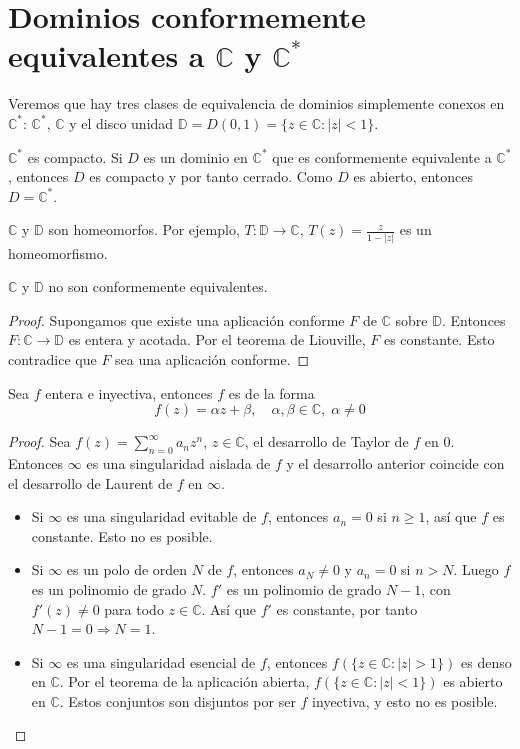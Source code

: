 \section{Dominios conformemente equivalentes a $\mathbb{C}$ y $\mathbb{C}^\ast$}
Veremos que hay tres clases de equivalencia de dominios simplemente conexos en $\mathbb{C}^\ast$: $\mathbb{C}^\ast$, $\mathbb{C}$ y el disco unidad $\mathbb{D} = D(0, 1) = \{z \in \mathbb{C} : |z| < 1\}$.

$\mathbb{C}^\ast$ es compacto.
Si $D$ es un dominio en $\mathbb{C}^\ast$ que es conformemente equivalente a $\mathbb{C}^\ast$, entonces $D$ es compacto y por tanto cerrado.
Como $D$ es abierto, entonces $D = \mathbb{C}^\ast$.

$\mathbb{C}$ y $\mathbb{D}$ son homeomorfos.
Por ejemplo, $T: \mathbb{D} \to \mathbb{C}$, $T(z) = \frac{z}{1-|z|}$ es un homeomorfismo.

\begin{proposition}
    $\mathbb{C}$ y $\mathbb{D}$ no son conformemente equivalentes.
\end{proposition}

\begin{proof}
    Supongamos que existe una aplicación conforme $F$ de $\mathbb{C}$ sobre $\mathbb{D}$.
    Entonces $F: \mathbb{C} \to \mathbb{D}$ es entera y acotada.
    Por el teorema de Liouville, $F$ es constante.
    Esto contradice que $F$ sea una aplicación conforme.
\end{proof}

\begin{proposition}
    Sea $f$ entera e inyectiva, entonces $f$ es de la forma
    $$f(z) = \alpha z + \beta, \quad \alpha, \beta \in \mathbb{C}, \; \alpha \neq 0$$
\end{proposition}

\begin{proof}
    Sea $f(z) = \sum_{n=0}^\infty a_nz^n$, $z \in \mathbb{C}$, el desarrollo de Taylor de $f$ en 0.
    Entonces $\infty$ es una singularidad aislada de $f$ y el desarrollo anterior coincide con el desarrollo de Laurent de $f$ en $\infty$.
    \begin{itemize}
        \item Si $\infty$ es una singularidad evitable de $f$, entonces $a_n = 0$ si $n \geq 1$, así que $f$ es constante.
              Esto no es posible.
        \item Si $\infty$ es un polo de orden $N$ de $f$, entonces $a_N \neq 0$ y $a_n = 0$ si $n > N$.
              Luego $f$ es un polinomio de grado $N$.
              $f'$ es un polinomio de grado $N-1$, con $f'(z) \neq 0$ para todo $z \in \mathbb{C}$.
              Así que $f'$ es constante, por tanto $N - 1 = 0 \Rightarrow N = 1$.
        \item Si $\infty$ es una singularidad esencial de $f$, entonces $f(\{z \in \mathbb{C} : |z| > 1\})$ es denso en $\mathbb{C}$.
              Por el teorema de la aplicación abierta, $f(\{z \in \mathbb{C} : |z| < 1\})$ es abierto en $\mathbb{C}$.
              Estos conjuntos son disjuntos por ser $f$ inyectiva, y esto no es posible.
    \end{itemize}
\end{proof}

